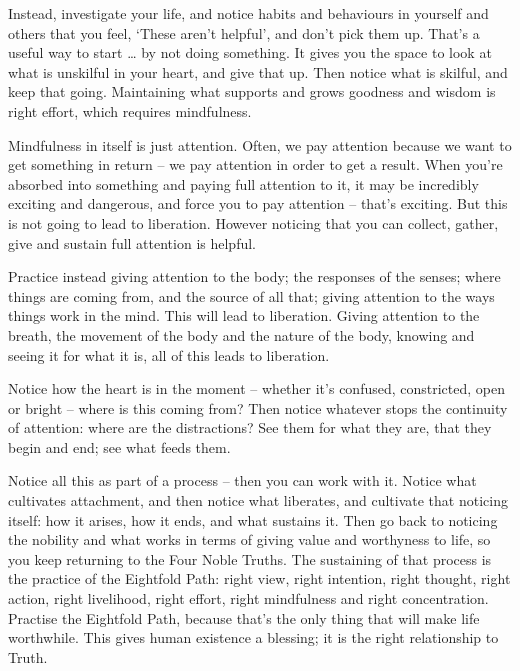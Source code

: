 Instead, investigate your life, and notice habits and
behaviours in yourself and others that you feel, `These aren't helpful',
and don't pick them up. That's a useful way to start \ldots{} by not doing
something. It gives you the space to look at what is unskilful in your heart,
and give that up. Then notice what is skilful, and keep that going. Maintaining
what supports and grows goodness and wisdom is right effort, which requires mindfulness.

Mindfulness in itself is just attention. Often, we pay attention because we want to get something in return -- we pay
attention in order to get a result. When you're absorbed into something and
paying full attention to it, it may be incredibly exciting and dangerous, and force
you to pay attention -- that's exciting. But this is not going to lead to
liberation. However noticing that you can collect, gather, give and sustain full attention is helpful. 

Practice instead giving attention to the body; the responses of the senses;
where things are coming from, and the source of all that; giving attention to the
ways things work in the mind. This will lead to liberation. Giving attention to
the breath, the movement of the body and the nature of the body, knowing and
seeing it for what it is, all of this leads to liberation.

Notice how the heart is in the moment -- whether it's confused, constricted,
open or bright -- where is this coming from? Then notice whatever stops
the continuity of attention: where are the distractions? See them for what they
are, that they begin and end; see what feeds them.

Notice all this as part of a process -- then you can work with it. Notice what
cultivates attachment, and then notice what liberates, and cultivate that
noticing itself: how it arises, how it ends, and what sustains it. Then go back
to noticing the nobility and what works in terms of giving value and worthyness to life, so you keep
returning to the Four Noble Truths. The sustaining of that process is the practice of the
Eightfold Path: right view, right intention, right thought, right action, right
livelihood, right effort, right mindfulness and right concentration. Practise
the Eightfold Path, because that's the only thing that will make life
worthwhile. This gives human existence a blessing; it is the right relationship
to Truth.

\enlargethispage{\baselineskip}

